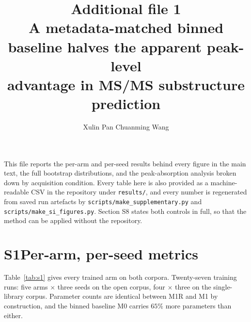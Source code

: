 \documentclass[11pt]{article}
\title{\vspace{-2em}\bfseries Additional file 1\\[4pt]
\large A metadata-matched binned baseline halves the apparent peak-level\\
 advantage in MS/MS substructure prediction}
\author{Xulin Pan \quad Chuanming Wang}
\date{}
\begin{document}
\maketitle

\noindent This file reports the per-arm and per-seed results behind every figure in
the main text, the full bootstrap distributions, and the peak-absorption analysis
broken down by acquisition condition. Every table here is also provided as a
machine-readable CSV in the repository under \texttt{results/}, and every number is
regenerated from saved run artefacts by \texttt{scripts/make\_supplementary.py} and
\texttt{scripts/make\_si\_figures.py}. Section S8 states both controls in full, so
that the method can be applied without the repository.

\section*{S1\quad Per-arm, per-seed metrics}

Table~\ref{tab:s1} gives every trained arm on both corpora. Twenty-seven training
runs: five arms $\times$ three seeds on the open corpus, four $\times$ three on the
single-library corpus. Parameter counts are
identical between M1R and M1 by construction, and the binned baseline M0 carries
$65\%$ more parameters than either.
\end{document}
